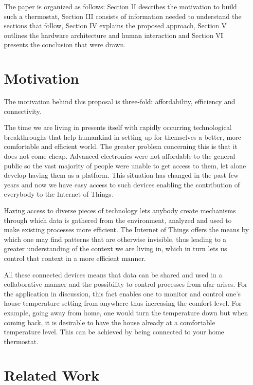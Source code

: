 \documentclass[conference]{IEEEtran}
\let\Oldsection\section
\renewcommand{\section}{\FloatBarrier\Oldsection}
\begin{document}
The paper is organized as follows: Section II describes the motivation to build such a thermostat, Section III
consists of information needed to understand the sections that follow, Section IV explains the proposed
approach, Section V outlines the hardware architecture and human interaction and Section VI presents the conclusion
that were drawn.

\section{Motivation}
\label{Motivation}

The motivation behind this proposal is three-fold: affordability, efficiency and connectivity.

The time we are living in presents itself with rapidly occurring technological breakthroughs that help
humankind in setting up for themselves a better, more comfortable and efficient world. The greater problem concerning
this is that it does not come cheap. Advanced electronics were not affordable to the general public so the vast
majority of people were unable to get access to them, let alone develop  having them as a platform. This
situation has changed in the past few years and now we have easy access to such devices enabling the
contribution of everybody to the Internet of Things.

Having access to diverse pieces of technology lets anybody create mechanisms through which data is gathered
from the environment, analyzed and used to make existing processes more efficient. The Internet of Things
offers the means by which one may find patterns that are otherwise invisible, thus leading to a greater
understanding of the context we are living in, which in turn lets us control that context in a more efficient
manner.

All these connected devices means that data can be shared and used in a collaborative manner and the
possibility to control processes from afar arises. For the application in discussion, this fact enables one to
monitor and control one's house temperature setting from anywhere thus increasing the comfort level. For
example, going away from home, one would turn the temperature down but when coming back, it is desirable to
have the house already at a comfortable temperature level. This can be achieved by being connected to your
home thermostat.

\section{Related Work}
\label{Related Work}
\end{document}
